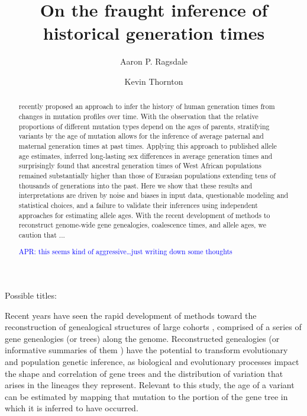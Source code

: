 \documentclass[]{article}
\newcommand{\aprcomment}[1]{{\textcolor{blue}{APR: #1}}}
\begin{document}
\title{On the fraught inference of historical generation times}
\author[1,*]{Aaron P. Ragsdale}
\author[2]{Kevin Thornton}
\maketitle

Possible titles:

\begin{abstract}

    \citet{wang2023human} recently proposed an approach to infer the history of
    human generation times from changes in mutation profiles over time. With
    the observation that the relative proportions of different mutation types
    depend on the ages of parents, stratifying variants by the age of mutation
    allows for the inference of average paternal and maternal generation times
    at past times. Applying this approach to published allele age estimates,
    \citeauthor{wang2023human} inferred long-lasting sex differences in average
    generation times and surprisingly found that ancestral generation times of
    West African populations remained substantially higher than those of
    Eurasian populations extending tens of thousands of generations into the
    past. Here we show that these results and interpretations are driven by
    noise and biases in input data, questionable modeling and statistical
    choices, and a failure to validate their inferences using independent
    approaches for estimating allele ages. With the recent development of
    methods to reconstruct genome-wide gene genealogies, coalescence times, and
    allele ages, we caution that ...

    \aprcomment{this seems kind of aggressive\ldots just writing down some thoughts}

\end{abstract}

Recent years have seen the rapid development of methods toward the
reconstruction of genealogical structures of large cohorts
\citep{speidel2019method,wohns2022unified,hubisz2020mapping}, comprised of a
series of gene genealogies (or trees) along the genome. Reconstructed
genealogies (or informative summaries of them \citep{albers2020dating}) have
the potential to transform evolutionary and population genetic inference, as
biological and evolutionary processes impact the shape and correlation of gene
trees and the distribution of variation that arises in the lineages they
represent. Relevant to this study, the age of a variant can be estimated by
mapping that mutation to the portion of the gene tree in which it is inferred
to have occurred.
\end{document}

